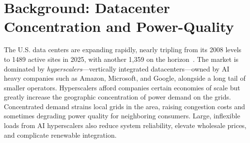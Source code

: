 \documentclass[sigconf,authordraft]{acmart}
\begin{document}
\section{Background: Datacenter Concentration and Power-Quality}
The U.S. data centers are expanding rapidly, nearly tripling from its 2008 levels to 1489 active sites in 2025, with another 1,359 on the horizon~\cite{aterio_us_data_centers_2025}. The market is dominated by \emph{hyperscalers}---vertically integrated datacenters---owned by AI heavy companies such as Amazon, Microsoft, and Google, alongside a long tail of smaller operators. Hyperscalers afford companies certain economies of scale but greatly increase the geographic concentration of power demand on the grids. Concentrated demand strains local grids in the area, raising congestion costs and sometimes degrading power quality for neighboring consumers. Large, inflexible loads from AI hyperscalers also reduce system reliability, elevate wholesale prices, and complicate renewable integration.

\end{document}
